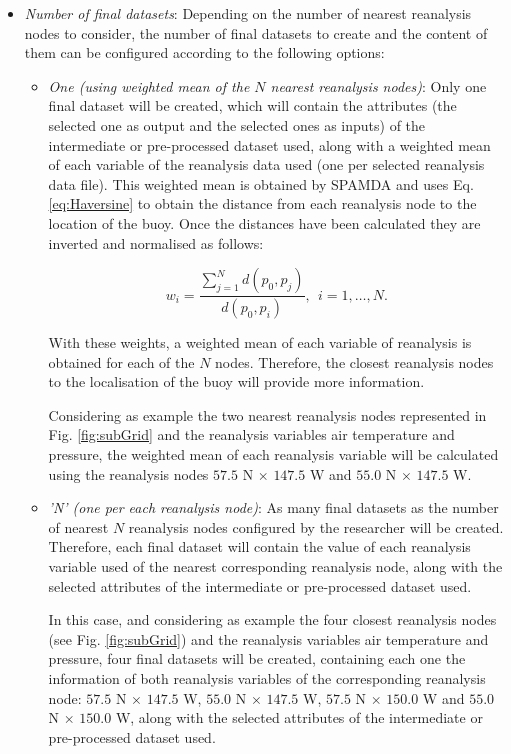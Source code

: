\documentclass[energies,article,submit,moreauthors,pdftex]{Definitions/mdpi}
\begin{document}
\begin{itemize}
					\item \textit{Number of final datasets}: Depending on the number of nearest reanalysis nodes to consider, the number of final datasets to create and the content of them can be configured according to the following options:
						\begin{itemize}
						
							\item \textit{One (using weighted mean of the $N$ nearest reanalysis nodes)}: Only one final dataset will be created, which will contain the attributes (the selected one as output and the selected ones as inputs) of the intermediate or pre-processed dataset used, along with a weighted mean of each variable of the reanalysis data used (one per selected reanalysis data file). This weighted mean is obtained by SPAMDA and uses Eq. \ref{eq:Haversine} to obtain the distance from each reanalysis node to the location of the buoy. Once the distances have been calculated they are inverted and normalised as follows:							
								\begin{linenomath*}
									\begin{equation}
										w_i=\frac{\sum_{j=1}^{N} d(p_0,p_j)}{d(p_0,p_i)}, ~~i=1, \ldots, N.
										\label{eq:weightedMean}
									\end{equation}
								\end{linenomath*}

							With these weights, a weighted mean of each variable of reanalysis is obtained for each of the $N$ nodes. Therefore, the closest reanalysis nodes to the localisation of the buoy will provide more information.
							
							Considering as example the two nearest reanalysis nodes represented in Fig. \ref{fig:subGrid} and the reanalysis variables air temperature and pressure, the weighted mean of each reanalysis variable will be calculated using the reanalysis nodes $57.5$ N $\times$ $147.5$ W and $55.0$ N $\times$ $147.5$ W.
							
							\item \textit{'N' (one per each reanalysis node)}: As many final datasets as the number of nearest $N$ reanalysis nodes configured by the researcher will be created. Therefore, each final dataset will contain the value of each reanalysis variable used of the nearest corresponding reanalysis node, along with the selected attributes of the intermediate or pre-processed dataset used.
							
							In this case, and considering as example the four closest reanalysis nodes (see Fig. \ref{fig:subGrid}) and the reanalysis variables air temperature and pressure, four final datasets will be created, containing each one the information of both reanalysis variables of the corresponding reanalysis node: $57.5$ N $\times$ $147.5$ W, $55.0$ N $\times$ $147.5$ W, $57.5$ N $\times$ $150.0$ W and $55.0$ N $\times$ $150.0$ W, along with the selected attributes of the intermediate or pre-processed dataset used.
							
						\end{itemize}
					
				\end{itemize}
						
\end{document}
